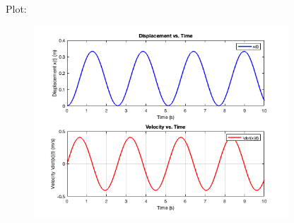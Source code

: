 \begin{homeworkProblem}
	Plot:
	\begin{figure}[ht]
		\begin{center}
			\includegraphics[width=0.85\textwidth]{images/matlab 01-2.17.png}
		\end{center}
	\end{figure}

\end{homeworkProblem}


